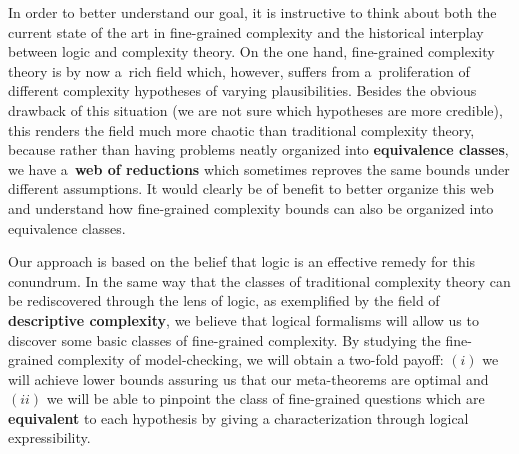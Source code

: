 \documentclass[a4paper,11pt]{article}
\newcommand{\eb}[1]{\noindent{\bf {\color{blue}{\sc ÉB:}  #1}}}
\begin{document}
In order to better understand our goal, it is instructive to think about both the current state of the art in fine-grained complexity and the historical interplay between logic and complexity theory.
On the one hand, fine-grained complexity theory is by now a~rich field which, however, suffers from a~proliferation of different complexity hypotheses of varying plausibilities.
Besides the obvious drawback of this situation (we are not sure which hypotheses are more credible), this renders the field much more chaotic than traditional complexity theory, because rather than having problems neatly organized into \textbf{equivalence classes}, we have a~\textbf{web of reductions} which sometimes reproves the same bounds under different assumptions.
It would clearly be of benefit to better organize this web and understand how fine-grained complexity bounds can also be organized into equivalence classes.


Our approach is based on the belief that logic is an effective remedy for this
conundrum.  In the same way that the classes of traditional complexity theory
can be rediscovered through the lens of logic, as exemplified by the field of
\textbf{descriptive complexity}, we believe that logical formalisms will allow
us to discover some basic classes of fine-grained complexity.  By studying the
fine-grained complexity of model-checking, we will obtain a two-fold payoff:
$(i)$ we will achieve lower bounds assuring us that our meta-theorems are
optimal and $(ii)$ we will be able to pinpoint the class of fine-grained
questions which are \textbf{equivalent} to each hypothesis by giving a
characterization through logical expressibility.
\end{document}
